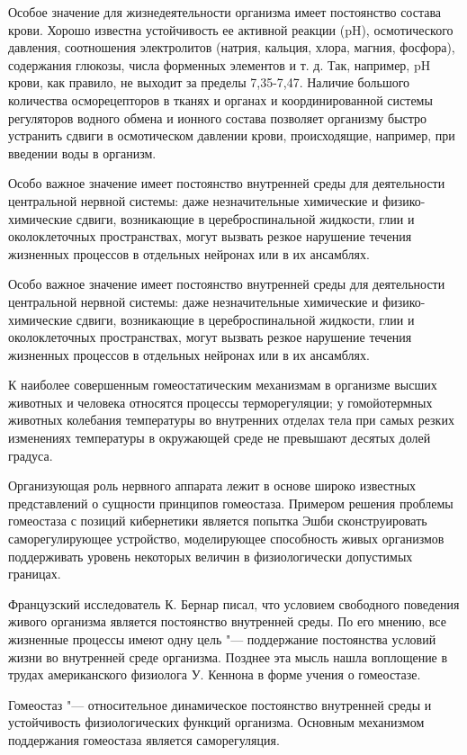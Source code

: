 \documentclass[12pt,a4paper,oneside]{book}
\begin{document}
Особое значение для жизнедеятельности организма имеет постоянство состава крови. Хорошо известна устойчивость ее активной реакции (pH), осмотического давления, соотношения электролитов (натрия, кальция, хлора, магния, фосфора), содержания глюкозы, числа форменных элементов и т. д. Так, например, pH крови, как правило, не выходит за пределы 7,35-7,47. Наличие большого количества осморецепторов в тканях и органах и координированной системы регуляторов водного обмена и ионного состава позволяет организму быстро устранить сдвиги в осмотическом давлении крови, происходящие, например, при введении воды в организм.

Особо важное значение имеет постоянство внутренней среды для деятельности центральной нервной системы: даже незначительные химические и физико-химические сдвиги, возникающие в цереброспинальной жидкости, глии и околоклеточных пространствах, могут вызвать резкое нарушение течения жизненных процессов в отдельных нейронах или в их ансамблях. 

Особо важное значение имеет постоянство внутренней среды для деятельности центральной нервной системы: даже незначительные химические и физико-химические сдвиги, возникающие в цереброспинальной жидкости, глии и околоклеточных пространствах, могут вызвать резкое нарушение течения жизненных процессов в отдельных нейронах или в их ансамблях. 

К наиболее совершенным гомеостатическим механизмам в организме высших животных и человека относятся процессы терморегуляции; у гомойотермных животных колебания температуры во внутренних отделах тела при самых резких изменениях температуры в окружающей среде не превышают десятых долей градуса.

Организующая роль нервного аппарата лежит в основе широко известных представлений о сущности принципов гомеостаза. Примером решения проблемы гомеостаза с позиций кибернетики является попытка Эшби сконструировать саморегулирующее устройство, моделирующее способность живых организмов поддерживать уровень некоторых величин в физиологически допустимых границах.

Французский исследователь К. Бернар писал, что условием свободного поведения живого организма является постоянство внутренней среды. По его мнению, все жизненные процессы имеют одну цель "--- поддержание постоянства условий жизни во внутренней среде организма. Позднее эта мысль нашла воплощение в трудах американского физиолога У. Кеннона в форме учения о гомеостазе.

Гомеостаз "--- относительное динамическое постоянство внутренней среды и устойчивость физиологических функций организма. Основным механизмом поддержания гомеостаза является саморегуляция.
\end{document}
